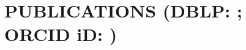 \documentclass[a4paper]{deedy-resume-openfont}
\begin{document}
\begin{minipage}[t]{0.67\textwidth}


\section[Publications]{PUBLICATIONS \small{(DBLP\@: \href{https://dblp.org/pid/215/9758}{}; ORCID iD\@: \href{https://orcid.org/0000-0003-1922-3151}{})}}
\vspace{\topsep} %


\end{minipage}
\end{document}
